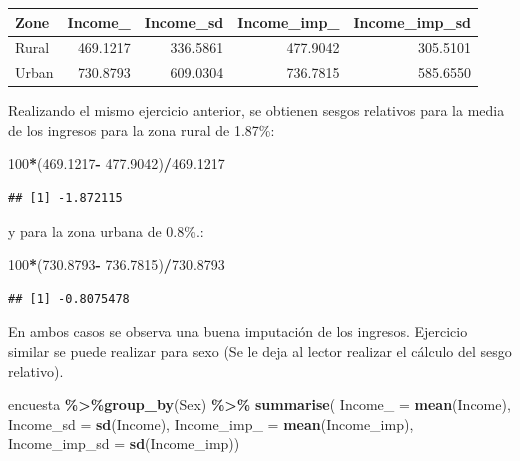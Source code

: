 \documentclass[
  spanish,
  12pt,
]{book}
\newenvironment{Shaded}{\begin{snugshade}}{\end{snugshade}}
\newcommand{\AttributeTok}[1]{\textcolor[rgb]{0.13,0.29,0.53}{#1}}
\newcommand{\DecValTok}[1]{\textcolor[rgb]{0.00,0.00,0.81}{#1}}
\newcommand{\FloatTok}[1]{\textcolor[rgb]{0.00,0.00,0.81}{#1}}
\newcommand{\FunctionTok}[1]{\textcolor[rgb]{0.13,0.29,0.53}{\textbf{#1}}}
\newcommand{\NormalTok}[1]{#1}
\newcommand{\SpecialCharTok}[1]{\textcolor[rgb]{0.81,0.36,0.00}{\textbf{#1}}}
\begin{document}
\begin{tabular}{l|r|r|r|r}
\hline
Zone & Income\_ & Income\_sd & Income\_imp\_ & Income\_imp\_sd\\
\hline
Rural & 469.1217 & 336.5861 & 477.9042 & 305.5101\\
\hline
Urban & 730.8793 & 609.0304 & 736.7815 & 585.6550\\
\hline
\end{tabular}

Realizando el mismo ejercicio anterior, se obtienen sesgos relativos para la media de los ingresos para la zona rural de 1.87\%:

\begin{Shaded}
\begin{Highlighting}[]
\DecValTok{100}\SpecialCharTok{*}\NormalTok{(}\FloatTok{469.1217}\SpecialCharTok{{-}} \FloatTok{477.9042}\NormalTok{)}\SpecialCharTok{/}\FloatTok{469.1217}
\end{Highlighting}
\end{Shaded}

\begin{verbatim}
## [1] -1.872115
\end{verbatim}

y para la zona urbana de 0.8\%.:

\begin{Shaded}
\begin{Highlighting}[]
\DecValTok{100}\SpecialCharTok{*}\NormalTok{(}\FloatTok{730.8793}\SpecialCharTok{{-}} \FloatTok{736.7815}\NormalTok{)}\SpecialCharTok{/}\FloatTok{730.8793}
\end{Highlighting}
\end{Shaded}

\begin{verbatim}
## [1] -0.8075478
\end{verbatim}

En ambos casos se observa una buena imputación de los ingresos. Ejercicio similar se puede realizar para sexo (Se le deja al lector realizar el cálculo del sesgo relativo).

\begin{Shaded}
\begin{Highlighting}[]
\NormalTok{encuesta }\SpecialCharTok{\%\textgreater{}\%}\FunctionTok{group\_by}\NormalTok{(Sex) }\SpecialCharTok{\%\textgreater{}\%}  \FunctionTok{summarise}\NormalTok{(}
  \AttributeTok{Income\_ =} \FunctionTok{mean}\NormalTok{(Income),}
  \AttributeTok{Income\_sd =} \FunctionTok{sd}\NormalTok{(Income),}
  \AttributeTok{Income\_imp\_ =} \FunctionTok{mean}\NormalTok{(Income\_imp),}
  \AttributeTok{Income\_imp\_sd =} \FunctionTok{sd}\NormalTok{(Income\_imp))}
\end{Highlighting}
\end{Shaded}
\end{document}
